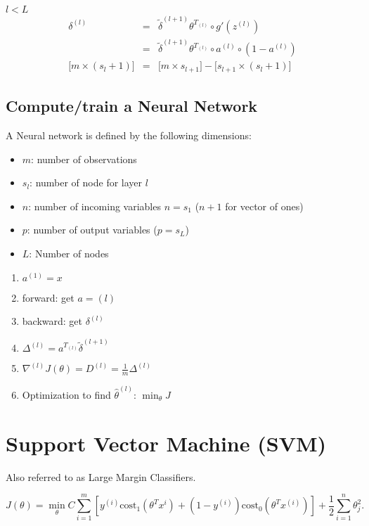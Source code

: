 \documentclass[a4paper,titlepage] {scrartcl}
\begin{document}
$l<L$
\begin{eqnarray}
	\delta^{(l)} &=& \tilde\delta^{(l+1)}\theta^{T_{(l)}} \circ g'(z^{(l)})\\
	&=& \tilde\delta^{(l+1)}\theta^{T_{(l)}} \circ a^{(l)} \circ (1 - a^{(l)})\\
	{[}m\times (s_l+1){]} &=& {[}m \times s_{l+1} {]} - {[}s_{l+1}\times (s_l+1){]}\nonumber
\end{eqnarray}

\subsection{Compute/train a Neural Network}

A Neural network is defined by the following dimensions:
\begin{itemize}
	\item $m$: number of observations
	\item $s_l$: number of node for layer $l$
	\item $n$: number of incoming variables $n=s_1$ ($n+1$ for vector of ones)
	\item $p$: number of output variables ($p = s_L$)
	\item $L$: Number of nodes
\end{itemize}

\begin{enumerate}
	\item $a^{(1)} = x$
	\item forward: get $a={(l)}$
	\item backward: get $\delta^{(l)}$
	\item $\Delta^{(l)} = a^{T_{(l)}}\tilde\delta^{(l+1)}$
	\item $\nabla^{(l)}J(\theta) = D^{(l)} = \frac{1}{m}\Delta^{(l)}$
	\item Optimization to find $\hat\theta^{(l)}$: $\min_\theta J$
\end{enumerate}


\section{Support Vector Machine (SVM)}
Also referred to as Large Margin Classifiers.

\begin{equation}
	J(\theta)=\min_\theta C\sum_{i=1}^m\left[y^{(i)}\text{cost}_1(\theta^Tx^{i}) + (1-y^{(i)})\text{cost}_0(\theta^Tx^{(i)})\right]+\frac{1}{2}\sum_{i=1}^n\theta_j^2.
\end{equation}
\end{document}
